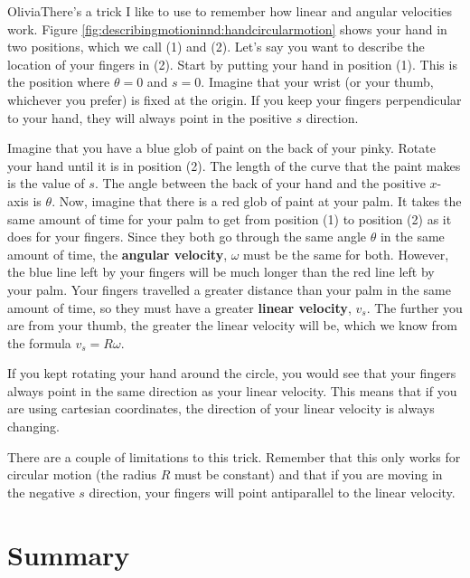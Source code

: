 \newpage
\begin{studentOpinion}{Olivia}There's a trick I like to use to remember how linear and angular velocities work. Figure \ref{fig:describingmotioninnd:handcircularmotion} shows your hand in two positions, which we call (1) and (2).
Let's say you want to describe the location of your fingers in (2). Start by putting your hand in position (1). This is the position where $\theta=0$ and $s=0$. Imagine that your wrist (or your thumb, whichever you prefer) is fixed at the origin. If you keep your fingers perpendicular to your hand, they will always point in the positive $s$ direction. 

Imagine that you have a blue glob of paint on the back of your pinky. Rotate your hand until it is in position (2). The length of the curve that the paint makes is the value of $s$. The angle between the back of your hand and the positive $x$-axis is $\theta$. Now, imagine that there is a red glob of paint at your palm. It takes the same amount of time for your palm to get from position (1) to position (2) as it does for your fingers. Since they both go through the same angle $\theta$ in the same amount of time, the \textbf{angular velocity}, $\omega$ must be the same for both. However, the blue line left by your fingers will be much longer than the red line left by your palm. Your fingers travelled a greater distance than your palm in the same amount of time, so they must have a greater \textbf{linear velocity}, $v_s$. The further you are from your thumb, the greater the linear velocity will be, which we know from the formula $v_s=R\omega$.

If you kept rotating your hand around the circle, you would see that your fingers always point in the same  direction as your linear velocity. This means that if you are using cartesian coordinates, the direction of your linear velocity is always changing.

There are a couple of limitations to this trick. Remember that this only works for circular motion (the radius $R$ must be constant) and that if you are moving in the negative $s$ direction, your fingers will point antiparallel to the linear velocity.
\end{studentOpinion}



\newpage
\section{Summary}

